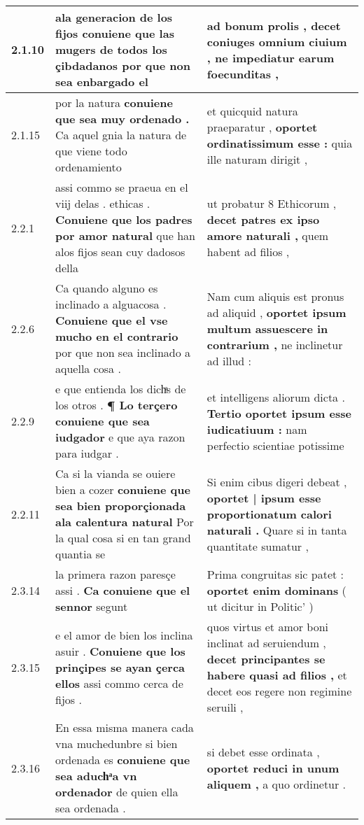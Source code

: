 \begin{tabular}{|p{1cm}|p{6.5cm}|p{6.5cm}|}
2.1.10 & ala generacion de los fijos \textbf{ conuiene que las mugers de todos los çibdadanos } por que non sea enbargado el & ad bonum prolis , \textbf{ decet coniuges omnium ciuium , } ne impediatur earum foecunditas , \\\hline
2.1.15 & por la natura \textbf{ conuiene que sea muy ordenado . } Ca aquel gnia la natura de que viene todo ordenamiento & et quicquid natura praeparatur , \textbf{ oportet ordinatissimum esse : } quia ille naturam dirigit , \\\hline
2.2.1 & assi commo se praeua en el viij delas . ethicas . \textbf{ Conuiene que los padres por amor natural } que han alos fijos sean cuy dadosos della & ut probatur 8 Ethicorum , \textbf{ decet patres ex ipso amore naturali , } quem habent ad filios , \\\hline
2.2.6 & Ca quando alguno es inclinado a alguacosa . \textbf{ Conuiene que el vse mucho en el contrario } por que non sea inclinado a aquella cosa . & Nam cum aliquis est pronus ad aliquid , \textbf{ oportet ipsum multum assuescere in contrarium , } ne inclinetur ad illud : \\\hline
2.2.9 & e que entienda los dichͣs de los otros . \textbf{ ¶ Lo terçero conuiene que sea iudgador } e que aya razon para iudgar . & et intelligens aliorum dicta . \textbf{ Tertio oportet ipsum esse iudicatiuum : } nam perfectio scientiae potissime \\\hline
2.2.11 & Ca si la vianda se ouiere bien a cozer \textbf{ conuiene que sea bien proporçionada ala calentura natural } Por la qual cosa si en tan grand quantia se & Si enim cibus digeri debeat , \textbf{ oportet | ipsum esse proportionatum calori naturali . } Quare si in tanta quantitate sumatur , \\\hline
2.3.14 & la primera razon paresçe assi . \textbf{ Ca conuiene que el sennor } segunt & Prima congruitas sic patet : \textbf{ oportet enim dominans } ( ut dicitur in Politic’ ) \\\hline
2.3.15 & e el amor de bien los inclina asuir . \textbf{ Conuiene que los prinçipes se ayan çerca ellos } assi commo cerca de fijos . & quos virtus et amor boni inclinat ad seruiendum , \textbf{ decet principantes se habere quasi ad filios , } et decet eos regere non regimine seruili , \\\hline
2.3.16 & En essa misma manera cada vna muchedunbre si bien ordenada es \textbf{ conuiene que sea aduchͣa vn ordenador } de quien ella sea ordenada . & si debet esse ordinata , \textbf{ oportet reduci in unum aliquem , } a quo ordinetur . \\\hline

\end{tabular}
